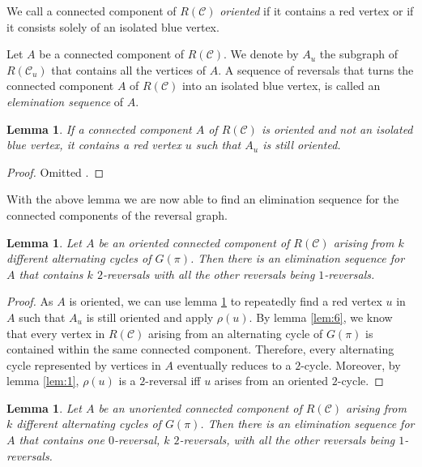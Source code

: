 \documentclass[11pt,DIV=11]{scrartcl}
\newtheorem{lemma}[theorem]{Lemma}
\theoremstyle{definition}
\theoremstyle{remark}
\begin{document}
We call a connected component of $R(\mathcal{C})$ \textit{oriented} if it contains a red vertex or if it consists solely of an isolated blue vertex.

Let $A$ be a connected component of $R(\mathcal{C})$. We denote by $A_u$ the subgraph of $R(\mathcal{C}_u)$ that contains all the vertices of $A$. A sequence of reversals that turns the connected component $A$ of $R(\mathcal{C})$ into an isolated blue vertex, is called an \textit{elemination sequence} of $A$.

\begin{lemma}
\label{lem:7}
If a connected component $A$ of $R(\mathcal{C})$ is oriented and not an isolated blue vertex, it contains a red vertex $u$ such that $A_u$ is still oriented.
\end{lemma}

\begin{proof}
Omitted \cite{Christie1998}.
\end{proof}

With the above lemma we are now able to find an elimination sequence for the connected components of the reversal graph.

\begin{lemma}
\label{lem:8}
Let $A$ be an oriented connected component of $R(\mathcal{C})$ arising from $k$ different alternating cycles of $G(\pi)$. Then there is an elimination sequence for $A$ that contains $k$ $2$-reversals with all the other reversals being $1$-reversals.
\end{lemma}

\begin{proof}
As $A$ is oriented, we can use lemma \ref{lem:7} to repeatedly find a red vertex $u$ in $A$ such that $A_u$ is still oriented and apply $\rho(u)$.
By lemma \ref{lem:6}, we know that every vertex in $R(\mathcal{C})$ arising from an alternating cycle of $G(\pi)$ is contained within the same connected component. Therefore, every alternating cycle represented by vertices in $A$ eventually reduces to a $2$-cycle. Moreover, by lemma \ref{lem:1}, $\rho(u)$ is a $2$-reversal iff $u$ arises from an oriented $2$-cycle.
\end{proof}

\begin{lemma}
\label{lem:9}
Let $A$ be an unoriented connected component of $R(\mathcal{C})$ arising from $k$ different alternating cycles of $G(\pi)$. Then there is an elimination sequence for $A$ that contains one $0$-reversal, $k$ $2$-reversals, with all the other reversals being $1$-reversals.
\end{lemma}
\end{document}
